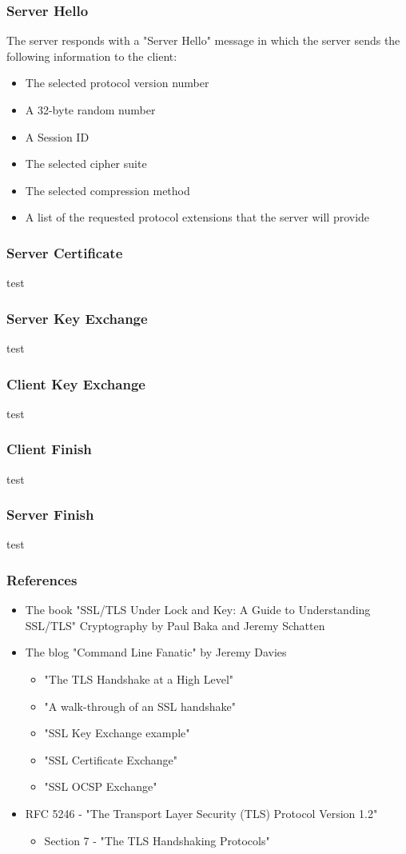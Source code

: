 \documentclass[aspectratio=169]{beamer}
\begin{document}
\begin{frame}[roundel=siiblue]
	\frametitle{Server Hello}
	The server responds with a "Server Hello" message in which the server sends the following information to the client:
	\begin{itemize}
		\item The selected protocol version number
		\item A 32-byte random number
		\item A Session ID
		\item The selected cipher suite
		\item The selected compression method
		\item A list of the requested protocol extensions that the server will provide
	\end{itemize}
\end{frame}


\begin{frame}[roundel=siiblue]
	\frametitle{Server Certificate}
	test
\end{frame}

\begin{frame}[roundel=siiblue]
	\frametitle{Server Key Exchange}
	test
\end{frame}

\begin{frame}[roundel=siiblue]
	\frametitle{Client Key Exchange}
	test
\end{frame}

\begin{frame}[roundel=siiblue]
	\frametitle{Client Finish}
	test
\end{frame}

\begin{frame}[roundel=siiblue]
	\frametitle{Server Finish}
	test
\end{frame}

\begin{frame}[roundel=siiblue]
	\frametitle{References}
	\begin{itemize}
		\item The book "SSL/TLS Under Lock and Key: A Guide to Understanding SSL/TLS" Cryptography by Paul Baka and Jeremy Schatten
		\item The blog "Command Line Fanatic" by Jeremy Davies
		\begin{itemize}
			\item "The TLS Handshake at a High Level"
			\item "A walk-through of an SSL handshake"
			\item "SSL Key Exchange example"
			\item "SSL Certificate Exchange"
			\item "SSL OCSP Exchange"
		\end{itemize}		
		\item RFC 5246 - "The Transport Layer Security (TLS) Protocol Version 1.2"
		\begin{itemize}
			\item Section 7 - "The TLS Handshaking Protocols"
		\end{itemize}
	\end{itemize}
\end{frame}
\end{document}
